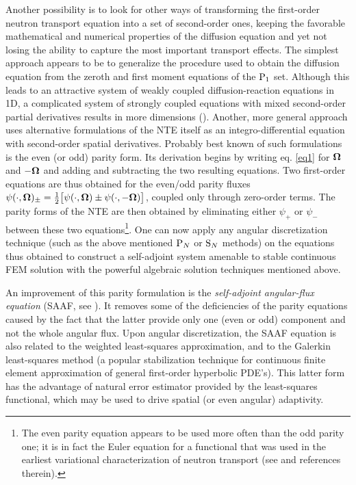 Another possibility is to look for other ways of transforming the first-order neutron transport equation into a set of
second-order ones, keeping the favorable mathematical and numerical properties of the diffusion equation and yet not
losing the ability to capture the most important transport effects. The simplest approach appears to be to generalize
the procedure used to obtain the diffusion equation from the zeroth and first moment equations of the $\PN[1]$ set.
Although this leads to an attractive system of weakly coupled diffusion-reaction equations in 1D, a complicated system
of strongly coupled equations with mixed second-order partial derivatives results in more dimensions (\cite{Capilla}).
Another, more general approach uses alternative formulations of the NTE itself as an integro-differential equation with
second-order spatial derivatives. Probably best known of such formulations is the even (or odd) parity form. Its
derivation begins by writing eq. \eqref{eq1} for $\bomega$ and $-\bomega$ and adding and subtracting the two resulting
equations. Two first-order equations are thus obtained for the even/odd parity fluxes  $\psi(\cdot,\bomega)_{\pm} =
\tfrac12\bigl[\psi(\cdot,\bomega) \pm \psi(\cdot,-\bomega)\bigr]$, coupled only through zero-order terms. The parity
forms of the NTE are then obtained by eliminating either $\psi_+$ or $\psi_-$ between these two equations\footnote{The
even parity equation appears to be used more often than the odd parity one; it is in fact the Euler equation for a
functional that was used in the earliest variational characterization of neutron transport (see \cite[Chap. 2]{Azmy1}
and references therein).}. One can now apply any angular discretization technique (such as the above mentioned $\PN$ or
$\SN$ methods) on the equations thus obtained to construct a self-adjoint system amenable to stable continuous FEM
solution with the powerful algebraic solution techniques mentioned above.

An improvement of this parity formulation is the \textit{self-adjoint angular-flux equation} (SAAF, see \cite{Morel1}).
It removes some of the deficiencies of the parity equations caused by the fact that the latter provide only one (even or
odd) component and not the whole angular flux. Upon angular discretization, the SAAF equation is also related to the
weighted least-squares approximation, and to the Galerkin least-squares method (a popular stabilization technique for
continuous finite element approximation of general first-order hyperbolic PDE's). This latter form has the advantage of
natural error estimator provided by the least-squares functional, which may be used to drive spatial (or even angular)
adaptivity.

